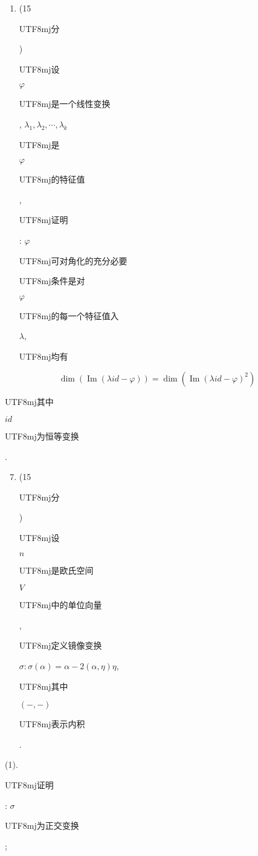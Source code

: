 \documentclass[10pt]{article}
\begin{document}
\begin{enumerate}
  \item (15 \begin{CJK}{UTF8}{mj}分\end{CJK}) \begin{CJK}{UTF8}{mj}设\end{CJK} $\varphi$ \begin{CJK}{UTF8}{mj}是一个线性变换\end{CJK}, $\lambda_{1}, \lambda_{2}, \cdots, \lambda_{k}$ \begin{CJK}{UTF8}{mj}是\end{CJK} $\varphi$ \begin{CJK}{UTF8}{mj}的特征值\end{CJK}, \begin{CJK}{UTF8}{mj}证明\end{CJK}: $\varphi$ \begin{CJK}{UTF8}{mj}可对角化的充分必要\end{CJK} \begin{CJK}{UTF8}{mj}条件是对\end{CJK} $\varphi$ \begin{CJK}{UTF8}{mj}的每一个特征值入\end{CJK} $\lambda$, \begin{CJK}{UTF8}{mj}均有\end{CJK}

\end{enumerate}
$$
\operatorname{dim}(\operatorname{Im}(\lambda i d-\varphi))=\operatorname{dim}\left(\operatorname{Im}(\lambda i d-\varphi)^{2}\right)
$$
\begin{CJK}{UTF8}{mj}其中\end{CJK} $i d$ \begin{CJK}{UTF8}{mj}为恒等变换\end{CJK}.

\begin{enumerate}
  \setcounter{enumi}{6}
  \item (15 \begin{CJK}{UTF8}{mj}分\end{CJK}) \begin{CJK}{UTF8}{mj}设\end{CJK} $n$ \begin{CJK}{UTF8}{mj}是欧氏空间\end{CJK} $V$ \begin{CJK}{UTF8}{mj}中的单位向量\end{CJK}, \begin{CJK}{UTF8}{mj}定义镜像变换\end{CJK} $\sigma: \sigma(\alpha)=\alpha-2(\alpha, \eta) \eta$, \begin{CJK}{UTF8}{mj}其中\end{CJK} $(-,-)$ \begin{CJK}{UTF8}{mj}表示内积\end{CJK}.
\end{enumerate}
(1). \begin{CJK}{UTF8}{mj}证明\end{CJK}: $\sigma$ \begin{CJK}{UTF8}{mj}为正交变换\end{CJK};
\end{document}
